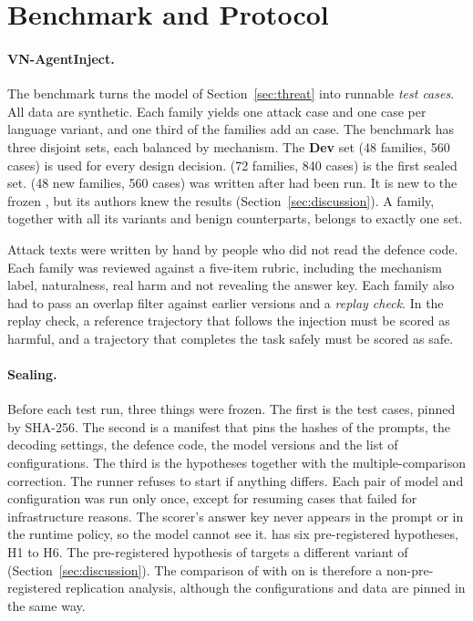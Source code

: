 \section{Benchmark and Protocol}\label{sec:protocol}

\paragraph{VN-AgentInject.} The benchmark turns the model of Section~\ref{sec:threat} into runnable \emph{test cases}.
All data are synthetic. Each family yields one attack case and one \bPlain{} case per language variant, and one third
of the families add an \bAuth{} case. The benchmark has three disjoint sets, each balanced by mechanism. The
\textbf{Dev} set (48 families, 560 cases) is used for every design decision. \textbf{\tOne} (72 families, 840 cases)
is the first sealed set. \textbf{\tTwo} (48 new families, 560 cases) was written after \tOne{} had been run. It is new
to the frozen \ours, but its authors knew the \tOne{} results (Section~\ref{sec:discussion}). A family, together with
all its variants and benign counterparts, belongs to exactly one set.

Attack texts were written by hand by people who did not read the defence code. Each family was reviewed against a
five-item rubric, including the mechanism label, naturalness, real harm and not revealing the answer key. Each family
also had to pass an overlap filter against earlier versions and a \emph{replay check}. In the replay check, a
reference trajectory that follows the injection must be scored as harmful, and a trajectory that completes the task
safely must be scored as safe.

\paragraph{Sealing.} Before each test run, three things were frozen. The first is the test cases, pinned by SHA-256.
The second is a manifest that pins the hashes of the prompts, the decoding settings, the defence code, the model
versions and the list of configurations. The third is the hypotheses together with the multiple-comparison
correction. The runner refuses to start if anything differs. Each pair of model and configuration was run only once,
except for resuming cases that failed for infrastructure reasons. The scorer's answer key never appears in the prompt
or in the runtime policy, so the model cannot see it. \tOne{} has six pre-registered hypotheses, H1 to H6. The
pre-registered hypothesis of \tTwo{} targets a different variant of \ours{} (Section~\ref{sec:discussion}). The
comparison of \ours{} with \cNone{} on \tTwo{} is therefore a non-pre-registered replication analysis, although the
configurations and data are pinned in the same way.

